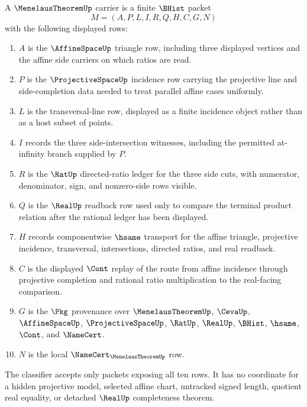 \begin{definition}
\label{def:menelaus-theorem-carrier}
A $\MenelausTheoremUp$ carrier is a finite $\BHist$ packet
$$
M=(A,P,L,I,R,Q,H,C,G,N)
$$
with the following displayed rows:
\begin{enumerate}
\item $A$ is the $\AffineSpaceUp$ triangle row, including three displayed vertices and the affine side carriers on which ratios are read.
\item $P$ is the $\ProjectiveSpaceUp$ incidence row carrying the projective line and side-completion data needed to treat parallel affine cases uniformly.
\item $L$ is the transversal-line row, displayed as a finite incidence object rather than as a host subset of points.
\item $I$ records the three side-intersection witnesses, including the permitted at-infinity branch supplied by $P$.
\item $R$ is the $\RatUp$ directed-ratio ledger for the three side cuts, with numerator, denominator, sign, and nonzero-side rows visible.
\item $Q$ is the $\RealUp$ readback row used only to compare the terminal product relation after the rational ledger has been displayed.
\item $H$ records componentwise $\hsame$ transport for the affine triangle, projective incidence, transversal, intersections, directed ratios, and real readback.
\item $C$ is the displayed $\Cont$ replay of the route from affine incidence through projective completion and rational ratio multiplication to the real-facing comparison.
\item $G$ is the $\Pkg$ provenance over $\MenelausTheoremUp$, $\CevaUp$, $\AffineSpaceUp$, $\ProjectiveSpaceUp$, $\RatUp$, $\RealUp$, $\BHist$, $\hsame$, $\Cont$, and $\NameCert$.
\item $N$ is the local $\NameCert_{\MenelausTheoremUp}$ row.
\end{enumerate}
The classifier accepts only packets exposing all ten rows. It has no coordinate for a hidden projective model, selected affine chart, untracked signed length, quotient real equality, or detached $\RealUp$ completeness theorem.
\end{definition}

